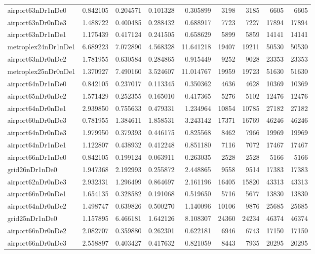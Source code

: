 \begin{longtable}{|l|r|r|r|r|r|r|r|r|}
airport63nDr1nDe0 & 0.842105 & 0.204571 & 0.101328 & 0.305899 & 3198 & 3185 & 6605 & 6605 \\
airport63nDr0nDe3 & 1.488722 & 0.400485 & 0.288432 & 0.688917 & 7723 & 7227 & 17894 & 17894 \\
airport63nDr1nDe1 & 1.175439 & 0.417124 & 0.241505 & 0.658629 & 5899 & 5859 & 14141 & 14141 \\
metroplex24nDr1nDe1 & 6.689223 & 7.072890 & 4.568328 & 11.641218 & 19407 & 19211 & 50530 & 50530 \\
airport63nDr0nDe2 & 1.781955 & 0.630584 & 0.284865 & 0.915449 & 9252 & 9028 & 23353 & 23353 \\
metroplex25nDr0nDe1 & 1.370927 & 7.490160 & 3.524607 & 11.014767 & 19959 & 19723 & 51630 & 51630 \\
airport64nDr1nDe0 & 0.842105 & 0.237017 & 0.113345 & 0.350362 & 4636 & 4628 & 10369 & 10369 \\
airport65nDr0nDe2 & 1.571429 & 0.252355 & 0.165010 & 0.417365 & 5276 & 5102 & 12476 & 12476 \\
airport64nDr0nDe1 & 2.939850 & 0.755633 & 0.479331 & 1.234964 & 10854 & 10785 & 27182 & 27182 \\
airport60nDr0nDe3 & 0.781955 & 1.384611 & 1.858531 & 3.243142 & 17371 & 16769 & 46246 & 46246 \\
airport64nDr0nDe3 & 1.979950 & 0.379393 & 0.446175 & 0.825568 & 8462 & 7966 & 19969 & 19969 \\
airport64nDr1nDe1 & 1.122807 & 0.438932 & 0.412248 & 0.851180 & 7116 & 7072 & 17467 & 17467 \\
airport66nDr1nDe0 & 0.842105 & 0.199124 & 0.063911 & 0.263035 & 2528 & 2528 & 5166 & 5166 \\
grid26nDr1nDe0 & 1.947368 & 2.192993 & 0.255872 & 2.448865 & 9558 & 9514 & 17383 & 17383 \\
airport62nDr0nDe3 & 2.932331 & 1.296499 & 0.864697 & 2.161196 & 16405 & 15820 & 43313 & 43313 \\
airport66nDr0nDe1 & 1.654135 & 0.328582 & 0.191068 & 0.519650 & 5716 & 5677 & 13830 & 13830 \\
airport64nDr0nDe2 & 1.498747 & 0.639826 & 0.500270 & 1.140096 & 10106 & 9876 & 25685 & 25685 \\
grid25nDr1nDe0 & 1.157895 & 6.466181 & 1.642126 & 8.108307 & 24360 & 24234 & 46374 & 46374 \\
airport66nDr0nDe2 & 2.082707 & 0.359880 & 0.262301 & 0.622181 & 6946 & 6743 & 17150 & 17150 \\
airport66nDr0nDe3 & 2.558897 & 0.403427 & 0.417632 & 0.821059 & 8443 & 7935 & 20295 & 20295 \\

\end{longtable}
